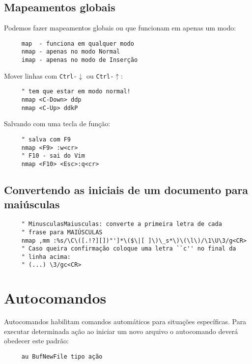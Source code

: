 \subsection{Mapeamentos globais}


Podemos fazer mapeamentos globais ou que funcionam em apenas um modo:

\begin{verbatim}
     map  - funciona em qualquer modo
     nmap - apenas no modo Normal
     imap - apenas no modo de Inserção
\end{verbatim}

Mover linhas com {\tt Ctrl-$\downarrow$} ou {\tt Ctrl-$\uparrow$}:

\begin{verbatim}
     " tem que estar em modo normal!
     nmap <C-Down> ddp
     nmap <C-Up> ddkP
\end{verbatim}

Salvando com uma tecla de função:

\begin{verbatim}
     " salva com F9
     nmap <F9> :w<cr>
     " F10 - sai do Vim
     nmap <F10> <Esc>:q<cr>
\end{verbatim}

\subsection{Convertendo as iniciais de um documento para maiúsculas}
\label{Convertendo as iniciais de um documento para maiúsculas}

\begin{verbatim}
     " MinusculasMaiusculas: converte a primeira letra de cada
     " frase para MAIÚSCULAS
     nmap ,mm :%s/\C\([.!?][])"']*\($\|[ ]\)\_s*\)\(\l\)/\1\U\3/g<CR>
     " Caso queira confirmação coloque uma letra ``c'' no final da 
     " linha acima:
     " (...) \3/gc<CR>
\end{verbatim}

\section{Autocomandos }
\label{Autocomandos }

Autocomandos habilitam comandos automáticos para situações
específicas. Para executar determinada ação ao
iniciar um novo arquivo o autocomando deverá obedecer este padrão:

\begin{verbatim}
     au BufNewFile tipo ação
\end{verbatim}


